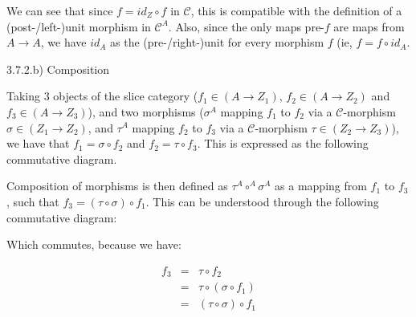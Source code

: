 \documentclass[12pt, letterpaper, twoside]{report}
\begin{document}
We can see that since $f = id_Z \circ f$ in $\mathcal{C}$, this is compatible with the definition of a (post-/left-)unit morphism in $\mathcal{C}^A$. Also, since the only maps pre-$f$ are maps from $A \to A$, we have $id_A$ as the (pre-/right-)unit for every morphism $f$ (ie, $f = f \circ id_A$. 

3.7.2.b) Composition

Taking 3 objects of the slice category ($f_1 \in (A \to Z_1)$, $f_2 \in (A \to Z_2)$ and $f_3 \in (A \to Z_3)$), and two morphisms ($\sigma^A$ mapping $f_1$ to $f_2$ via a $\mathcal{C}$-morphism $\sigma \in (Z_1 \to Z_2)$, and $\tau^A$ mapping $f_2$ to $f_3$ via a $\mathcal{C}$-morphism $\tau \in (Z_2 \to Z_3)$), we have that $f_1 = \sigma \circ f_2$ and $f_2 = \tau  \circ f_3$. This is expressed as the following commutative diagram.


Composition of morphisms is then defined as $\tau^A \circ^A \sigma^A$ as a mapping from $f_1$ to $f_3$, such that $f_3 = (\tau \circ \sigma) \circ f_1$. This can be understood through the following commutative diagram:


Which commutes, because we have:

$$
\begin{aligned}
	f_3 &=&  \tau \circ                f_2  \\
		&=&  \tau \circ (\sigma  \circ f_1) \\
		&=& (\tau \circ  \sigma) \circ f_1
\end{aligned}
$$
\end{document}
